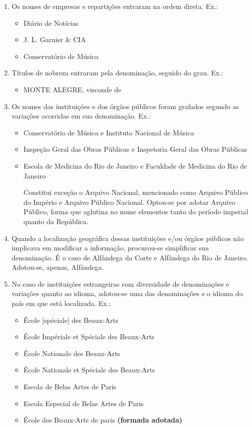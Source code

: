 \begin{enumerate}[label=(\alph*)]
	\item Os nomes de empresas e repartições entraram na ordem direta. Ex.:
	\begin{itemize}
		\item Diário de Notícias
		\item J. L. Garnier \& CIA
		\item Conservatório de Música
	\end{itemize}

	\item Títulos de nobreza entraram pela denominação, seguido do grau. Ex.:
	\begin{itemize}
		\item MONTE ALEGRE, visconde de
	\end{itemize}
	
	\item Os nomes das instituições e dos órgãos públicos foram grafados segundo as variações ocorridas em sua denominação. Ex.:
	\begin{itemize}
		\item Conservatório de Música e Instituto Nacional de Música
		\item Inspeção Geral das Obras Públicas e Inspetoria Geral das Obras Públicas
		\item Escola de Medicina do Rio de Janeiro e Faculdade de Medicina do Rio de Janeiro
		
		Constitui exceção o Arquivo Nacional, mencionado como Arquivo Público do Império e Arquivo Público Nacional. Optou-se por adotar Arquivo Público, forma que aglutina no nome elementos tanto do período imperial quanto da República.
	\end{itemize}

	\item Quando a localização geográfica dessas instituições e/ou órgãos públicos não implicava em modificar a informação, procurou-se simplificar sua denominação. É o caso de Alfândega da Corte e Alfândega do Rio de Janeiro. Adotou-se, apenas, Alfândega.
	
	\item No caso de instituições estrangeiras com diversidade de denominações e variações quanto ao idioma, adotou-se uma das denominações e o idioma do país em que está localizada. Ex.:
	\begin{itemize}
		\item École [spéciale] des Beaux-Arts
		\item École Impériale et Spéciale des Beaux-Arts
		\item École Nationale des Beaux-Arts
		\item École Nationale et Spéciale des Beaux-Arts
		\item Escola de Belas Artes de Paris
		\item Escola Especial de Belas Artes de Paris
		\item École des Beaux-Arts de paris \textbf{(formada adotada)}
		

\end{itemize}
\end{enumerate}
